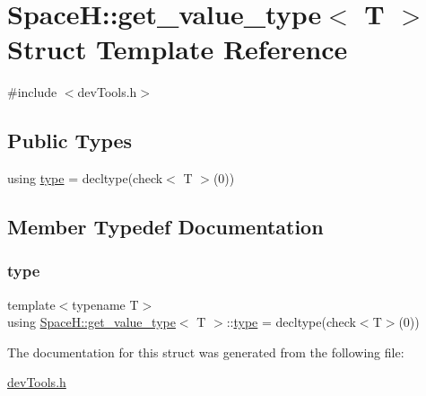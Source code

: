 \hypertarget{struct_space_h_1_1get__value__type}{}\section{SpaceH\+:\+:get\+\_\+value\+\_\+type$<$ T $>$ Struct Template Reference}
\label{struct_space_h_1_1get__value__type}


{\ttfamily \#include $<$dev\+Tools.\+h$>$}

\subsection*{Public Types}
\begin{DoxyCompactItemize}
\item 
using \mbox{\hyperlink{struct_space_h_1_1get__value__type_a22e0b1ebb5f91bb129a9487208ebd7c7}{type}} = decltype(check$<$ T $>$(0))
\end{DoxyCompactItemize}


\subsection{Member Typedef Documentation}
\mbox{\label{struct_space_h_1_1get__value__type_a22e0b1ebb5f91bb129a9487208ebd7c7}} 
\subsubsection{\texorpdfstring{type}{type}}
{\footnotesize\ttfamily template$<$typename T$>$ \\
using \mbox{\hyperlink{struct_space_h_1_1get__value__type}{Space\+H\+::get\+\_\+value\+\_\+type}}$<$ T $>$\+::\mbox{\hyperlink{struct_space_h_1_1get__value__type_a22e0b1ebb5f91bb129a9487208ebd7c7}{type}} =  decltype(check$<$T$>$(0))}



The documentation for this struct was generated from the following file\+:\begin{DoxyCompactItemize}
\item 
\mbox{\hyperlink{dev_tools_8h}{dev\+Tools.\+h}}\end{DoxyCompactItemize}
